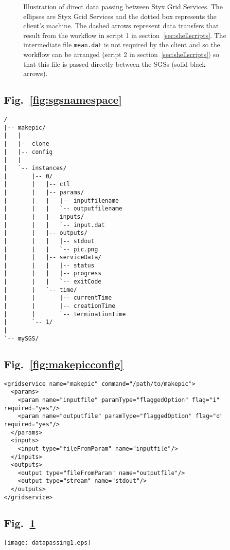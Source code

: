 \documentclass[a4paper]{article}
\begin{document}
\begin{figure}[h]
\caption{Illustration of direct data passing between Styx Grid Services.  The ellipses are Styx Grid Services and the dotted box represents the client's machine.  The dashed arrows represent data transfers that result from the workflow in script 1 in section~\ref{sec:shellscripts}.  The intermediate file \texttt{mean.dat} is not required by the client and so the workflow can be arranged (script 2 in section~\ref{sec:shellscripts}) so that this file is passed directly between the SGSs (solid black arrows).}\label{fig:datapassing}
\end{figure}

\newpage

\subsection*{Fig.~\ref{fig:sgsnamespace}}
\begin{verbatim}
/
|-- makepic/
|   |
|   |-- clone
|   |-- config
|   |
|   `-- instances/
|       |-- 0/
|       |   |-- ctl
|       |   |-- params/
|       |   |   |-- inputfilename
|       |   |   `-- outputfilename
|       |   |-- inputs/
|       |   |   `-- input.dat
|       |   |-- outputs/
|       |   |   |-- stdout
|       |   |   `-- pic.png
|       |   |-- serviceData/
|       |   |   |-- status
|       |   |   |-- progress
|       |   |   `-- exitCode
|       |   `-- time/
|       |       |-- currentTime
|       |       |-- creationTime
|       |       `-- terminationTime
|       `-- 1/
|
`-- mySGS/
\end{verbatim}

\newpage

\subsection*{Fig.~\ref{fig:makepicconfig}}

\begin{verbatim}
<gridservice name="makepic" command="/path/to/makepic">
  <params>
    <param name="inputfile" paramType="flaggedOption" flag="i" required="yes"/>
    <param name="outputfile" paramType="flaggedOption" flag="o" required="yes"/>
  </params>
  <inputs>
    <input type="fileFromParam" name="inputfile"/>
  </inputs>
  <outputs>
    <output type="fileFromParam" name="outputfile"/>
    <output type="stream" name="stdout"/>
  </outputs>
</gridservice>
\end{verbatim}

\newpage

\subsection*{Fig.~\ref{fig:datapassing}}
\texttt{[image: datapassing1.eps]}
\end{document}
